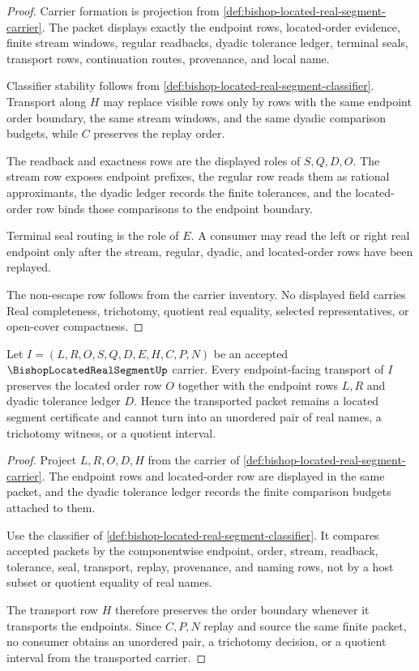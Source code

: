\begin{proof}
Carrier formation is projection from \autoref{def:bishop-located-real-segment-carrier}. The packet displays exactly the endpoint rows, located-order evidence, finite stream windows, regular readbacks, dyadic tolerance ledger, terminal seals, transport rows, continuation routes, provenance, and local name.

Classifier stability follows from \autoref{def:bishop-located-real-segment-classifier}. Transport along $H$ may replace visible rows only by rows with the same endpoint order boundary, the same stream windows, and the same dyadic comparison budgets, while $C$ preserves the replay order.

The readback and exactness rows are the displayed roles of $S,Q,D,O$. The stream row exposes endpoint prefixes, the regular row reads them as rational approximants, the dyadic ledger records the finite tolerances, and the located-order row binds those comparisons to the endpoint boundary.

Terminal seal routing is the role of $E$. A consumer may read the left or right real endpoint only after the stream, regular, dyadic, and located-order rows have been replayed.

The non-escape row follows from the carrier inventory. No displayed field carries Real completeness, trichotomy, quotient real equality, selected representatives, or open-cover compactness.
\end{proof}

\begin{theorem}
\label{thm:bishop-located-real-segment-endpoint-order-stability}
Let $I=(L,R,O,S,Q,D,E,H,C,P,N)$ be an accepted $\BishopLocatedRealSegmentUp$ carrier. Every endpoint-facing transport of $I$ preserves the located order row $O$ together with the endpoint rows $L,R$ and dyadic tolerance ledger $D$. Hence the transported packet remains a located segment certificate and cannot turn into an unordered pair of real names, a trichotomy witness, or a quotient interval.
\end{theorem}
\begin{proof}
Project $L,R,O,D,H$ from the carrier of \autoref{def:bishop-located-real-segment-carrier}. The endpoint rows and located-order row are displayed in the same packet, and the dyadic tolerance ledger records the finite comparison budgets attached to them.

Use the classifier of \autoref{def:bishop-located-real-segment-classifier}. It compares accepted packets by the componentwise endpoint, order, stream, readback, tolerance, seal, transport, replay, provenance, and naming rows, not by a host subset or quotient equality of real names.

The transport row $H$ therefore preserves the order boundary whenever it transports the endpoints. Since $C,P,N$ replay and source the same finite packet, no consumer obtains an unordered pair, a trichotomy decision, or a quotient interval from the transported carrier.
\end{proof}

